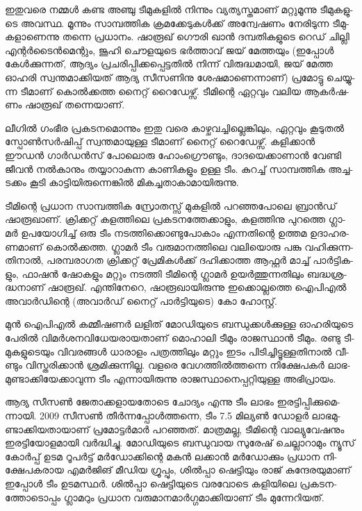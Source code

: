 ഇ­തു­വ­രെ നമ്മള്‍ കണ്ട അഞ്ചു ടീ­മു­ക­ളില്‍ നി­ന്നും വ്യ­ത്യ­സ്ത­മാ­ണ് മറ്റു­മൂ­ന്നു ടീ­മു­ക­ളു­ടെ അവ­സ്ഥ. മൂ­ന്നും സാ­മ്പ­ത്തിക 
ക്ര­മ­ക്കേ­ടു­കള്‍­ക്ക് അന്വേ­ഷ­ണം നേ­രി­ടു­ന്ന ടീ­മു­ക­ളാ­ണെ­ന്നു തന്നെ പ്ര­ധാ­നം. ഷാ­രൂ­ഖ് ഗൌ­രി ഖാന്‍ ദമ്പ­തി­ക­ളു­ടെ റെ­ഡ് 
ചി­ല്ലി എന്റര്‍­ടൈന്‍­മെ­ന്റും, ജൂ­ഹി ചൌ­ള­യു­ടെ ഭര്‍­ത്താ­വ് ജയ് മേ­ത്ത­യും (ഇ­പ്പോള്‍ കേള്‍­ക്കു­ന്ന­ത്, ആദ്യം പ്ര­ച­രി­പ്പി­ക്ക­പ്പെ­ട്ട­തില്‍ 
നി­ന്ന് വി­രു­ദ്ധ­മാ­യി, ജയ് മേ­ത്ത ഓഹ­രി സ്വ­ന്ത­മാ­ക്കി­യ­ത് ആദ്യ സീ­സ­ണി­നു ശേ­ഷ­മാ­ണെ­ന്നാ­ണ്) പ്ര­മോ­ട്ടു ചെ­യ്യു­ന്ന ടീ­മാ­ണ് 
കൊല്‍­ക്ക­ത്ത നൈ­റ്റ് റൈ­ഡേ­ഴ്സ്. ടീ­മി­ന്റെ ഏറ്റ­വും വലിയ ആകര്‍­ഷ­ണം ഷാ­രൂ­ഖ് തന്നെ­യാ­ണ്.

­ലീ­ഗില്‍ ഗം­ഭീര പ്ര­ക­ട­ന­മൊ­ന്നും ഇതു വരെ കാ­ഴ്ച­വ­ച്ചി­ല്ലെ­ങ്കി­ലും, ഏറ്റ­വും കൂ­ടു­തല്‍ സ്പോണ്‍­സര്‍­ഷി­പ്പ് സ്വ­ന്ത­മാ­യു­ള്ള ടീ­മാ­ണ് 
നൈ­റ്റ് റൈ­ഡേ­ഴ്സ്. കളി­ക്കാന്‍ ഈഡന്‍ ഗാര്‍­ഡന്‍­സ് പോ­ലൊ­രു ഹോം­ഗ്രൌ­ണ്ടും, ദാ­ദ­യെ­ക്കാ­ണാന്‍ വേ­ണ്ടി ജീ­വന്‍ 
നല്‍­കാ­നും തയ്യാ­റാ­കു­ന്ന കാ­ണി­ക­ളും ഉള്ള ടീം. കു­റ­ച്ച് സാ­മ്പ­ത്തിക അച്ച­ട­ക്കം കൂ­ടി കാ­ട്ടി­യി­രു­ന്നെ­ങ്കില്‍ മി­ക­ച്ച­താ­കാ­മാ­യി­രു­ന്നു­.

­ടീ­മി­ന്റെ പ്ര­ധാന സാ­മ്പ­ത്തിക സ്രോ­ത­സ്സ് മു­ക­ളില്‍ പറ­ഞ്ഞ­പോ­ലെ ബ്രാന്‍­ഡ് ഷാ­രൂ­ഖാ­ണ്. ക്രി­ക്ക­റ്റ് കള­ത്തി­ലെ 
പ്ര­ക­ട­ന­ത്തേ­ക്കാ­ളും, കള­ത്തി­നു പു­റ­ത്തെ ഗ്ലാ­മര്‍ ഉപ­യോ­ഗി­ച്ച് ഒരു ടീം നട­ത്തി­ക്കൊ­ണ്ടു­പോ­കാം എന്ന­തി­ന്റെ ഉത്തമ 
ഉദാ­ഹ­ര­ണ­മാ­ണ് കൊല്‍­ക്ക­ത്ത. ഗ്ലാ­മര്‍ ടീം വരു­മാ­ന­ത്തി­ലെ വലി­യൊ­രു പങ്കു വഹി­ക്കു­ന്ന­തി­നാല്‍, പര­മ്പ­രാ­ഗത ക്രി­ക്ക­റ്റ് 
പ്രേ­മി­കള്‍­ക്ക് ദഹി­ക്കാ­ത്ത ആഫ്റ്റര്‍ മാ­ച്ച് പാര്‍­ട്ടി­ക­ളും, ഫാ­ഷന്‍ ഷോ­ക­ളും മറ്റും നട­ത്തി ടീ­മി­ന്റെ ഗ്ലാ­മര്‍ ഉയര്‍­ത്തു­ന്ന­തി­ലും 
ബദ്ധ­ശ്ര­ദ്ധ­നാ­ണ് ഷാ­രൂ­ഖ്. എന്തി­നേ­റെ, ഷാ­രൂ­ഖാ­യി­രു­ന്നു ഇക്കൊ­ല്ല­ത്തെ ഐപി­എല്‍ അവാര്‍­ഡി­ന്റെ (അ­വാര്‍­ഡ് 
നൈ­റ്റ് പാര്‍­ട്ടി­യു­ടെ) കോ ഹോ­സ്റ്റ്.

­മുന്‍ ഐപി­എല്‍ കമ്മീ­ഷ­ണര്‍ ലളി­ത് മോ­ഡി­യു­ടെ ബന്ധു­ക്കള്‍­ക്കു­ള്ള ഓഹ­രി­യു­ടെ പേ­രില്‍ വി­മര്‍­ശ­ന­വി­ധേ­യ­രാ­യ­താ­ണ് 
മൊ­ഹാ­ലി ടീ­മും രാ­ജ­സ്ഥാന്‍ ടീ­മും. രണ്ടു ടീ­മു­ക­ളു­ടെ­യും വി­വ­ര­ങ്ങള്‍ ധാ­രാ­ളം പത്ര­ത്തി­ലും മറ്റും ഇടം പി­ടി­ച്ചി­ട്ടൂ­ള്ള­തി­നാല്‍ വീ­ണ്ടും 
വി­സ്ത­രി­ക്കാന്‍ ശ്ര­മി­ക്കു­ന്നി­ല്ല. വള­രെ വേ­ഗ­ത്തില്‍­ത്ത­ന്നെ നി­ക്ഷേ­പ­കര്‍ ലാ­ഭ­മു­ണ്ടാ­ക്കി­യേ­ക്കാ­വു­ന്ന ടീം എന്നാ­യി­രു­ന്നു 
രാ­ജ­സ്ഥാ­നെ­പ്പ­റ്റി­യു­ള്ള അഭി­പ്രാ­യം­.

ആ­ദ്യ സീ­സണ്‍ ജേ­താ­ക്ക­ളാ­യ­തോ­ടെ ചോ­ദ്യം എന്നു ടീം ലാ­ഭം ഇര­ട്ടി­പ്പി­ക്കു­മെ­ന്നാ­യി. 2009 സീ­സണ്‍ തീര്‍­ന്ന­പ്പോള്‍­ത്ത­ന്നെ, 
ടീം 7.5 മി­ല്യണ്‍ ഡോ­ളര്‍ ലാ­ഭ­മു­ണ്ടാ­ക്കി­യ­താ­യാ­ണ് പ്ര­മോ­ട്ടര്‍­മാര്‍ പറ­ഞ്ഞ­ത്. മാ­ത്ര­മ­ല്ല, ടീ­മി­ന്റെ വാ­ല്യു­വേ­ഷ­നും ഇര­ട്ടി­യോ­ള­മാ­യി 
വര്‍­ദ്ധി­ച്ചു. മോ­ഡി­യു­ടെ ബന്ധു­വായ സു­രേ­ഷ് ചെ­ല്ലാ­റാ­മും ന്യൂ­സ് കോര്‍­പ്പ് ഉടമ റൂ­പര്‍­ട്ട് മര്‍­ഡോ­ക്കി­ന്റെ മകന്‍ ലക്കാന്‍ 
മര്‍­ഡോ­ക്കും പ്ര­ധാന നി­ക്ഷേ­പ­ക­രായ എമര്‍­ജി­ങ് മീ­ഡിയ ഗ്രൂ­പ്പും, ശില്‍­പ്പാ ഷെ­ട്ടി­യും രാ­ജ് കു­ന്ദേ­ര­യു­മാ­ണ് ഇപ്പോള്‍ ടീം 
ഉട­മ­സ്ഥര്‍. ശില്‍­പ്പാ ഷെ­ട്ടി­യു­ടെ വര­വോ­ടെ കളി­യി­ലെ പ്ര­ക­ട­ന­ത്തോ­ടൊ­പ്പം ഗ്ലാ­മ­റും പ്ര­ധാന വരു­മാ­ന­മാര്‍­ഗ്ഗ­മാ­ക്കി­യാ­ണ് 
ടീം മു­ന്നേ­റി­യ­ത്.

